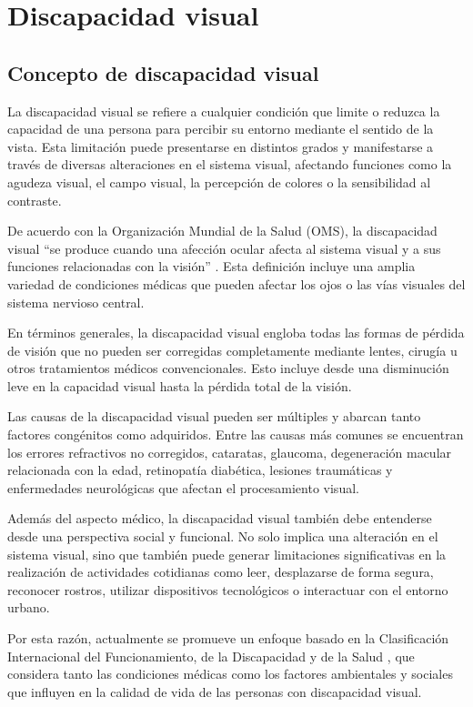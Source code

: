 \section{Discapacidad visual}

\subsection{Concepto de discapacidad visual}
La discapacidad visual se refiere a cualquier condición que limite o reduzca la capacidad de una persona para percibir su entorno mediante el sentido de la vista. Esta limitación puede presentarse en distintos grados y manifestarse a través de diversas alteraciones en el sistema visual, afectando funciones como la agudeza visual, el campo visual, la percepción de colores o la sensibilidad al contraste.

De acuerdo con la Organización Mundial de la Salud (OMS), la discapacidad visual “se produce cuando una afección ocular afecta al sistema visual y a sus funciones relacionadas con la visión” \cite{who_blindness2026}. Esta definición incluye una amplia variedad de condiciones médicas que pueden afectar los ojos o las vías visuales del sistema nervioso central.

En términos generales, la discapacidad visual engloba todas las formas de pérdida de visión que no pueden ser corregidas completamente mediante lentes, cirugía u otros tratamientos médicos convencionales. Esto incluye desde una disminución leve en la capacidad visual hasta la pérdida total de la visión.

Las causas de la discapacidad visual pueden ser múltiples y abarcan tanto factores congénitos como adquiridos. Entre las causas más comunes se encuentran los errores refractivos no corregidos, cataratas, glaucoma, degeneración macular relacionada con la edad, retinopatía diabética, lesiones traumáticas y enfermedades neurológicas que afectan el procesamiento visual.

Además del aspecto médico, la discapacidad visual también debe entenderse desde una perspectiva social y funcional. No solo implica una alteración en el sistema visual, sino que también puede generar limitaciones significativas en la realización de actividades cotidianas como leer, desplazarse de forma segura, reconocer rostros, utilizar dispositivos tecnológicos o interactuar con el entorno urbano.

Por esta razón, actualmente se promueve un enfoque basado en la Clasificación Internacional del Funcionamiento, de la Discapacidad y de la Salud \cite{who_icf2001}, que considera tanto las condiciones médicas como los factores ambientales y sociales que influyen en la calidad de vida de las personas con discapacidad visual.

